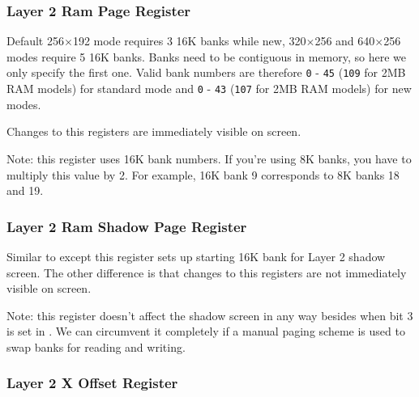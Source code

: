 \subsubsection{Layer 2 Ram Page Register }

\begin{NextPort}
\end{NextPort}

Default 256$\times$192 mode requires 3 16K banks while new, 320$\times$256 and 640$\times$256 modes require 5 16K banks. Banks need to be contiguous in memory, so here we only specify the first one. Valid bank numbers are therefore {\tt 0} - {\tt 45} ({\tt 109} for 2MB RAM models) for standard mode and {\tt 0} - {\tt 43} ({\tt 107} for 2MB RAM models) for new modes.

Changes to this registers are immediately visible on screen.

Note: this register uses 16K bank numbers. If you're using 8K banks, you have to multiply this value by 2. For example, 16K bank 9 corresponds to 8K banks 18 and 19.


\subsubsection{Layer 2 Ram Shadow Page Register }

\begin{NextPort}
\end{NextPort}

Similar to  except this register sets up starting 16K bank for Layer 2 shadow screen. The other difference is that changes to this registers are not immediately visible on screen.

Note: this register doesn't affect the shadow screen in any way besides when bit 3 is set in . We can circumvent it completely if a manual paging scheme is used to swap banks for reading and writing.


\subsubsection{Layer 2 X Offset Register }

\begin{NextPort}
\end{NextPort}

